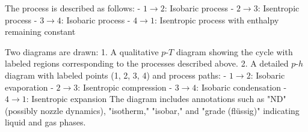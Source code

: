 The process is described as follows:  
- \( 1 \to 2 \): Isobaric process  
- \( 2 \to 3 \): Isentropic process  
- \( 3 \to 4 \): Isobaric process  
- \( 4 \to 1 \): Isentropic process with enthalpy remaining constant  

Two diagrams are drawn:  
1. A qualitative \( p \)-\( T \) diagram showing the cycle with labeled regions corresponding to the processes described above.  
2. A detailed \( p \)-\( h \) diagram with labeled points (1, 2, 3, 4) and process paths:  
   - \( 1 \to 2 \): Isobaric evaporation  
   - \( 2 \to 3 \): Isentropic compression  
   - \( 3 \to 4 \): Isobaric condensation  
   - \( 4 \to 1 \): Isentropic expansion  
   The diagram includes annotations such as "ND" (possibly nozzle dynamics), "isotherm," "isobar," and "grade (flüssig)" indicating liquid and gas phases.